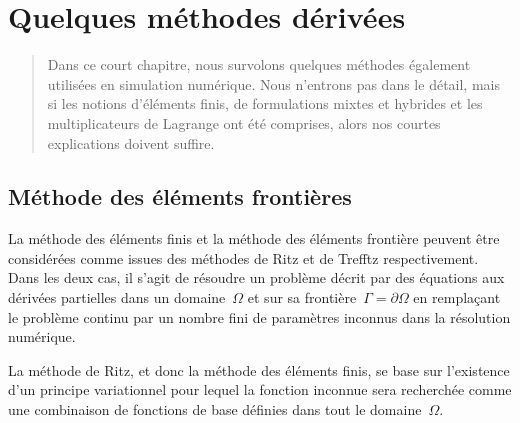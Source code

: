 \chapter{Quelques méthodes dérivées}\label{Ch-XFEM}
\begin{abstract} Dans ce court chapitre, nous survolons quelques méthodes également utilisées en simulation numérique. Nous n'entrons pas dans le détail, mais si les notions d'éléments finis, de formulations mixtes et hybrides et les multiplicateurs de Lagrange ont été comprises, alors nos courtes explications doivent suffire.
\end{abstract} %


\medskip
\section{Méthode des éléments frontières}\label{Sec-BEM}
La méthode des éléments finis et la méthode des éléments frontière peuvent être considérées comme issues des méthodes de Ritz et de Trefftz respectivement. Dans les deux cas, il s'agit de résoudre un problème décrit par des équations aux dérivées partielles dans un domaine~$\Omega$ et sur sa frontière~$\Gamma=\partial\Omega$ en remplaçant le problème continu par un nombre fini de paramètres inconnus dans la résolution numérique.

\medskip
La méthode de Ritz, et donc la méthode des éléments finis, se base sur l'existence d'un principe variationnel pour lequel la fonction inconnue sera recherchée comme une combinaison de fonctions de base définies dans tout le domaine~$\Omega$.

